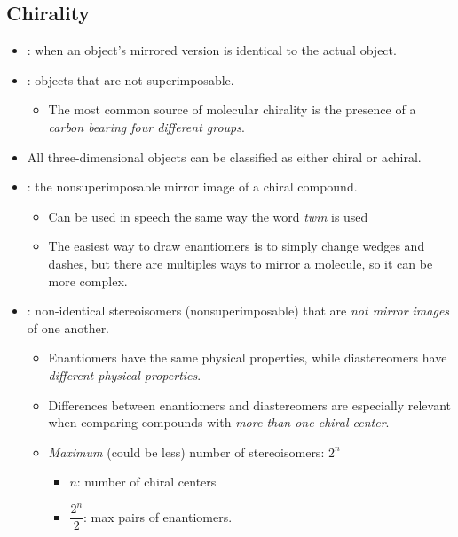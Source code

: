 \documentclass{inVerba-notes}
\begin{document}
\begin{itemize}
  \subsection{Chirality}
  \begin{itemize}
    \item {}: when an object's mirrored version is identical to the actual object.
    \item {}: objects that are not superimposable.
      \begin{itemize}
        \item The most common source of molecular chirality is the presence of a \emph{carbon bearing four different groups}.
      \end{itemize}
    \item All three-dimensional objects can be classified as either chiral or achiral.
    \item {}: the nonsuperimposable mirror image of a chiral compound.
      \begin{itemize}
          \item Can be used in speech the same way the word \emph{twin} is used
          \item The easiest way to draw enantiomers is to simply change wedges and dashes, but there are multiples ways to mirror a molecule, so it can be more complex.
      \end{itemize}
    \item {}: non-identical stereoisomers (nonsuperimposable) that are \emph{not mirror images} of one another. 
      \begin{itemize}
          \item  Enantiomers have the same physical properties, while diastereomers have \emph{different physical properties}.
          \item Differences between enantiomers and diastereomers are especially relevant when comparing compounds with \emph{more than one chiral center}.
          \item \emph{Maximum} (could be less) number of stereoisomers: \emph{\(2^n\)}
        \begin{itemize}
          \item \(n\): number of chiral centers
          \item \(\dfrac{2^n}{2}\): max pairs of enantiomers.
        \end{itemize}
      \end{itemize}
    \end{itemize}


\end{itemize}
\end{document}

